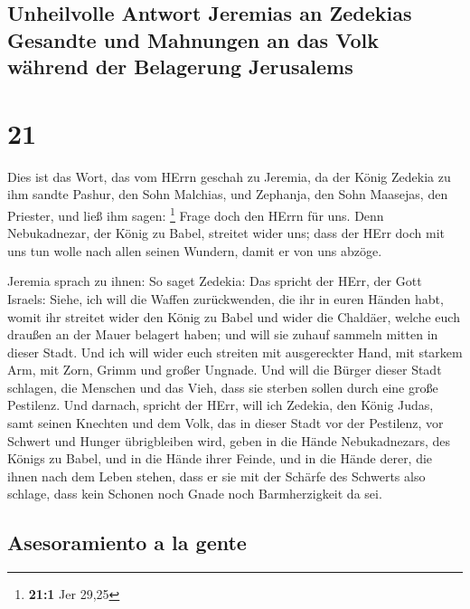\hypertarget{unheilvolle-antwort-jeremias-an-zedekias-gesandte-und-mahnungen-an-das-volk-wuxe4hrend-der-belagerung-jerusalems}{%
\subsection{Unheilvolle Antwort Jeremias an Zedekias Gesandte und
Mahnungen an das Volk während der Belagerung
Jerusalems}\label{unheilvolle-antwort-jeremias-an-zedekias-gesandte-und-mahnungen-an-das-volk-wuxe4hrend-der-belagerung-jerusalems}}

\hypertarget{section-20}{%
\section{21}\label{section-20}}

 Dies ist das Wort, das vom HErrn geschah zu Jeremia, da
der König Zedekia zu ihm sandte Pashur, den Sohn Malchias, und Zephanja,
den Sohn Maasejas, den Priester, und ließ ihm sagen: \footnote{\textbf{21:1}
  Jer 29,25}  Frage doch den HErrn für uns. Denn
Nebukadnezar, der König zu Babel, streitet wider uns; dass der HErr doch
mit uns tun wolle nach allen seinen Wundern, damit er von uns abzöge.

 Jeremia sprach zu ihnen: So saget Zedekia: 
Das spricht der HErr, der Gott Israels: Siehe, ich will die Waffen
zurückwenden, die ihr in euren Händen habt, womit ihr streitet wider den
König zu Babel und wider die Chaldäer, welche euch draußen an der Mauer
belagert haben; und will sie zuhauf sammeln mitten in dieser Stadt.
 Und ich will wider euch streiten mit ausgereckter Hand,
mit starkem Arm, mit Zorn, Grimm und großer Ungnade.  Und
will die Bürger dieser Stadt schlagen, die Menschen und das Vieh, dass
sie sterben sollen durch eine große Pestilenz.  Und
darnach, spricht der HErr, will ich Zedekia, den König Judas, samt
seinen Knechten und dem Volk, das in dieser Stadt vor der Pestilenz, vor
Schwert und Hunger übrigbleiben wird, geben in die Hände Nebukadnezars,
des Königs zu Babel, und in die Hände ihrer Feinde, und in die Hände
derer, die ihnen nach dem Leben stehen, dass er sie mit der Schärfe des
Schwerts also schlage, dass kein Schonen noch Gnade noch Barmherzigkeit
da sei.

\hypertarget{asesoramiento-a-la-gente}{%
\subsection{Asesoramiento a la gente}\label{asesoramiento-a-la-gente}}

